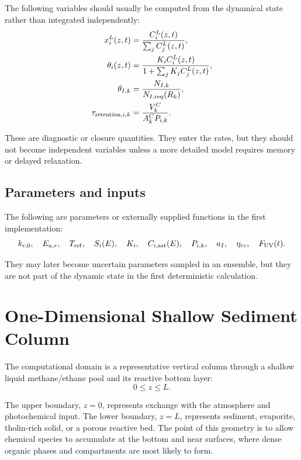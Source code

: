 \documentclass[11pt]{article}
\begin{document}
The following variables should usually be computed from the dynamical state rather than integrated independently:
\begin{align}
x_i^L(z,t) &= \frac{C_i^L(z,t)}{\sum_j C_j^L(z,t)},\\
\theta_i(z,t) &= \frac{K_i C_i^L(z,t)}{1+\sum_j K_j C_j^L(z,t)},\\
\theta_{I,k} &= \frac{N_{I,k}}{N_{I,\rm req}(R_k)},\\
\tau_{{\rm retention},i,k} &= \frac{V_k^C}{A_k^C P_{i,k}}.
\end{align}

These are diagnostic or closure quantities. They enter the rates, but they should not become independent variables unless a more detailed model requires memory or delayed relaxation.

\subsection{Parameters and inputs}

The following are parameters or externally supplied functions in the first implementation:
\begin{equation}
k_{r,0},\quad E_{a,r},\quad T_{\rm ref},\quad S_i(E),\quad K_i,\quad
C_{i,\rm sat}(E),\quad P_{i,k},\quad a_I,\quad \eta_{rc},\quad F_{\rm UV}(t).
\end{equation}

They may later become uncertain parameters sampled in an ensemble, but they are not part of the dynamic state in the first deterministic calculation.

\section{One-Dimensional Shallow Sediment Column}

The computational domain is a representative vertical column through a shallow liquid methane/ethane pool and its reactive bottom layer:
\begin{equation}
0 \le z \le L.
\end{equation}

The upper boundary, $z=0$, represents exchange with the atmosphere and photochemical input. The lower boundary, $z=L$, represents sediment, evaporite, tholin-rich solid, or a porous reactive bed. The point of this geometry is to allow chemical species to accumulate at the bottom and near surfaces, where dense organic phases and compartments are most likely to form.
\end{document}
